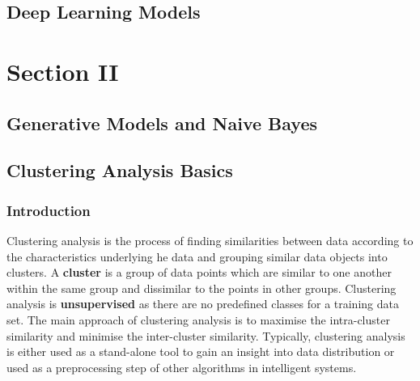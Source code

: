 \documentclass[11pt,fleqn]{book} %
\begin{document}


\chapter{Deep Learning Models}


\part{Section II}



\chapter{Generative Models and Naive Bayes}



\chapter{Clustering Analysis Basics}

\section*{Introduction}
Clustering analysis is the process of finding similarities between data according to the characteristics underlying he data and grouping similar data objects into clusters. A \textbf{cluster} is a group of data points which are similar to one another within the same group and dissimilar to the points in other groups. Clustering analysis is \textbf{unsupervised} as there are no predefined classes for a training data set. The main approach of clustering analysis is to maximise the intra-cluster similarity and minimise the inter-cluster similarity. Typically, clustering analysis is either used as a stand-alone tool to gain an insight into data distribution or used as a preprocessing step of other algorithms in intelligent systems.\\
\end{document}
